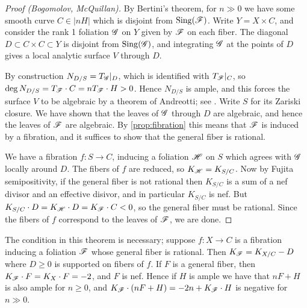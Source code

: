 \begin{proof}[Proof (Bogomolov, McQuillan)]
    By Bertini's theorem, for $n\gg0$ we have some smooth curve $C\in|nH|$ which
    is disjoint from $\operatorname{Sing}(\mathscr{F})$. Write $Y=X\times C$, and consider the rank
    1 foliation $\mathscr{G}$ on $Y$ given by $\mathscr{F}$ on each fiber. The diagonal
    $D\subset C\times C\subset Y$ is disjoint from $\operatorname{Sing}(\mathscr{G})$, and
    integrating $\mathscr{G}$ at the points of $D$ gives a local analytic surface $V$
    through $D$.

    By construction $N_{D/S}=T_{\mathscr{G}}|_D$, which is identified with $T_{\mathscr{F}}|_C$,
    so $\deg N_{D/S}=T_{\mathscr{F}}\cdot C=nT_{\mathscr{F}}\cdot H>0$. Hence $N_{D/S}$ is
    ample, and this forces the surface $V$ to be algebraic by a theorem of
    Andreotti; see \cite[Thm 3.4]{bost_13}. Write $S$ for its Zariski closure.
    We have shown that the leaves of $\mathscr{G}$ through $D$ are algebraic, and
    hence the leaves of $\mathscr{F}$ are algebraic. By \cref{prop:fibration} this
    means that $\mathscr{F}$ is induced by a fibration, and it suffices to show that
    the general fiber is rational.

    We have a fibration $f:S\to C$, inducing a foliation $\mathscr{H}$ on $S$ which
    agrees with $\mathscr{G}$ locally around $D$. The fibers of $f$ are reduced, so
    $K_{\mathscr{H}}=K_{S/C}$. Now by Fujita semipositivity, if the general fiber is not
    rational then $K_{S/C}$ is a sum of a nef divisor and an effective disivor,
    and in particular $K_{S/C}$ is nef. But
    $K_{S/C}\cdot D=K_{\mathscr{H}}\cdot D=K_{\mathscr{F}}\cdot C<0$, so the general fiber must
    be rational. Since the fibers of $f$ correspond to the leaves of $\mathscr{F}$, we
    are done.
\end{proof}

\begin{remark}
    The condition in this theorem is necessary; suppose $f:X\to C$ is a
    fibration inducing a foliation $\mathscr{F}$ whose general fiber is rational. Then
    $K_{\mathscr{F}}=K_{X/C}-D$ where $D\ge0$ is supported on fibers of $f$. If $F$ is a
    general fiber, then $K_{\mathscr{F}}\cdot F=K_X\cdot F=-2$, and $F$ is nef. Hence if
    $H$ is ample we have that $nF+H$ is also ample for $n\ge0$, and
    $K_{\mathscr{F}}\cdot(nF+H)=-2n+K_{\mathscr{F}}\cdot H$ is negative for $n\gg0$.
\end{remark}
